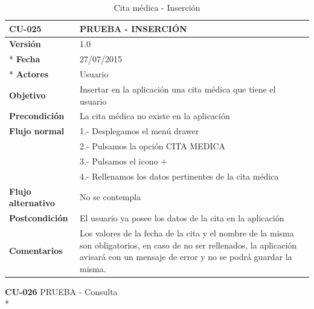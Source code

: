\documentclass[../pfc.tex]{subfiles}
\begin{document}
		\begin{table}[H]
			\centering
			\begin{tabular}[t]{|p{3cm}|p{9.5cm}|}
				\hline \textbf{CU-025} & \textbf{PRUEBA - INSERCIÓN} \\*
				\hline\hline \textbf{Versión} & 1.0 \\ *
				\hline\hline \textbf{Fecha} & 27/07/2015 \\ *
				\hline\textbf{Actores} 	& Usuario\\*
				\hline \textbf{Objetivo} & Insertar en la aplicación una cita médica que tiene el usuario\\* 			
				\hline \textbf{Precondición} & La cita médica no existe en la aplicación\\* 
				\hline \textbf{Flujo normal} & 1.- Desplegamos el menú drawer \\* 
				& 2.- Pulsamos la opción CITA MEDICA\\*	
				& 3.- Pulsamos el icono +\\*	
				& 4.- Rellenamos los datos pertinentes de la cita médica\\*	
				\hline \textbf{Flujo alternativo} & No se contempla \\* 
				\hline \textbf{Postcondición} & El usuario ya posee los datos de la cita en la aplicación \\* 
				\hline \textbf{Comentarios}   & Los valores de la fecha de la cita y el nombre de la misma son obligatorios, en caso de no ser rellenados, la aplicación avisará con un mensaje de error y no se podrá guardar la misma.\\*
				\hline
			\end{tabular}
			\caption{Cita médica - Inserción}
			\label{tabla:caso025}
		\end{table}
		
		
		
		
		\textbf{CU-026}	PRUEBA - Consulta\\*
		
\end{document}
